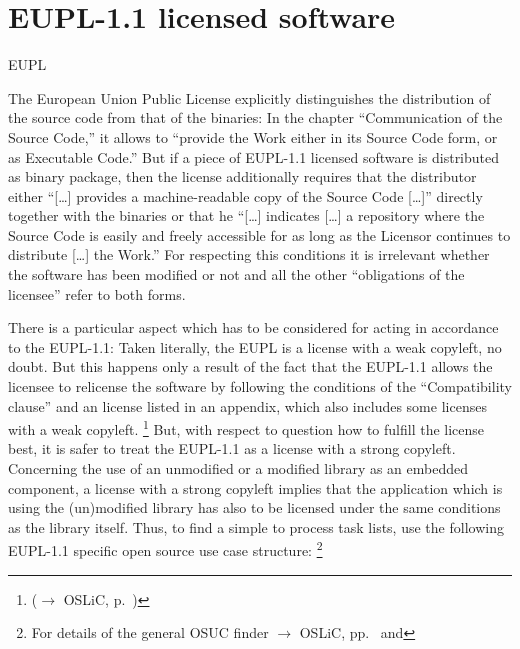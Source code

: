 \section{EUPL-1.1 licensed software}
\begin{license}{EUPL} %

The European Union Public License explicitly distinguishes the distribution of
the source code from that of the binaries: In the chapter \enquote{Communication
of the Source Code,} it allows to \enquote{provide the Work either in its Source
Code form, or as Executable Code.} But if a piece of EUPL-1.1 licensed
software is distributed as binary package, then the license additionally
requires that the distributor either \enquote{[\ldots] provides a
machine-readable copy of the Source Code [\ldots]} directly together with the
binaries or that he \enquote{[\ldots] indicates [\ldots] a
repository where the Source Code is easily and freely accessible for as long 
as the Licensor continues to distribute [\ldots] the Work.} For
respecting this conditions it is irrelevant whether the software has been
modified or not and all the other \enquote{obligations of the licensee} refer to
both forms.

There is a particular aspect which has to be considered for acting in
accordance to the EUPL-1.1: Taken literally, the EUPL is a license with a weak
copyleft, no doubt. But this happens only a result of the fact that the EUPL-1.1
allows the licensee to relicense the software by following the conditions of the
\enquote{Compatibility clause} and an license listed in an
appendix, which also includes some licenses with a weak copyleft.%
  \footnote{($\rightarrow$ OSLiC, p.\ )} 
But, with respect to question how to fulfill the license best, it is safer to
treat the EUPL-1.1 as a license with a strong copyleft. Concerning the use of an
unmodified or a modified library as an embedded component, a license with 
a strong copyleft implies that the application which is using the
(un)modified library has also to be licensed under the same conditions as the
library itself. 
Thus, to find a simple to process task lists, use the following EUPL-1.1
specific open source use case structure:%
  \footnote{For details of the general OSUC finder $\rightarrow$ OSLiC,
    pp.\ \pageref{OsucTokens} and \pageref{OsucDefinitionTree}} 


\end{license}
